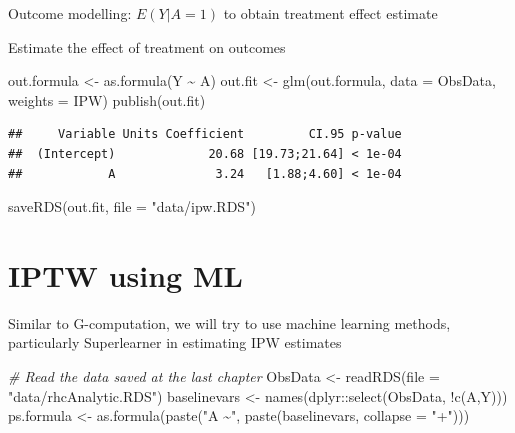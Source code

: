 \documentclass[
]{book}
\newenvironment{Shaded}{\begin{snugshade}}{\end{snugshade}}
\newcommand{\AttributeTok}[1]{\textcolor[rgb]{0.77,0.63,0.00}{#1}}
\newcommand{\CommentTok}[1]{\textcolor[rgb]{0.56,0.35,0.01}{\textit{#1}}}
\newcommand{\FunctionTok}[1]{\textcolor[rgb]{0.00,0.00,0.00}{#1}}
\newcommand{\NormalTok}[1]{#1}
\newcommand{\OtherTok}[1]{\textcolor[rgb]{0.56,0.35,0.01}{#1}}
\newcommand{\SpecialCharTok}[1]{\textcolor[rgb]{0.00,0.00,0.00}{#1}}
\newcommand{\StringTok}[1]{\textcolor[rgb]{0.31,0.60,0.02}{#1}}
\begin{document}
\begin{rmdcomment}
Outcome modelling: \(E(Y|A=1)\) to obtain treatment effect estimate
\end{rmdcomment}

Estimate the effect of treatment on outcomes

\begin{Shaded}
\begin{Highlighting}[]
\NormalTok{out.formula }\OtherTok{\textless{}{-}} \FunctionTok{as.formula}\NormalTok{(Y }\SpecialCharTok{\textasciitilde{}}\NormalTok{ A)}
\NormalTok{out.fit }\OtherTok{\textless{}{-}} \FunctionTok{glm}\NormalTok{(out.formula,}
               \AttributeTok{data =}\NormalTok{ ObsData,}
               \AttributeTok{weights =}\NormalTok{ IPW)}
\FunctionTok{publish}\NormalTok{(out.fit)}
\end{Highlighting}
\end{Shaded}

\begin{verbatim}
##     Variable Units Coefficient         CI.95 p-value 
##  (Intercept)             20.68 [19.73;21.64] < 1e-04 
##            A              3.24   [1.88;4.60] < 1e-04
\end{verbatim}

\begin{Shaded}
\begin{Highlighting}[]
\FunctionTok{saveRDS}\NormalTok{(out.fit, }\AttributeTok{file =} \StringTok{"data/ipw.RDS"}\NormalTok{)}
\end{Highlighting}
\end{Shaded}

\hypertarget{iptw-using-ml}{%
\chapter{IPTW using ML}\label{iptw-using-ml}}

Similar to G-computation, we will try to use machine learning methods, particularly Superlearner in estimating IPW estimates

\begin{Shaded}
\begin{Highlighting}[]
\CommentTok{\# Read the data saved at the last chapter}
\NormalTok{ObsData }\OtherTok{\textless{}{-}} \FunctionTok{readRDS}\NormalTok{(}\AttributeTok{file =} \StringTok{"data/rhcAnalytic.RDS"}\NormalTok{)}
\NormalTok{baselinevars }\OtherTok{\textless{}{-}} \FunctionTok{names}\NormalTok{(dplyr}\SpecialCharTok{::}\FunctionTok{select}\NormalTok{(ObsData, }\SpecialCharTok{!}\FunctionTok{c}\NormalTok{(A,Y)))}
\NormalTok{ps.formula }\OtherTok{\textless{}{-}} \FunctionTok{as.formula}\NormalTok{(}\FunctionTok{paste}\NormalTok{(}\StringTok{"A \textasciitilde{}"}\NormalTok{,}
                               \FunctionTok{paste}\NormalTok{(baselinevars,}
                                     \AttributeTok{collapse =} \StringTok{"+"}\NormalTok{)))}
\end{Highlighting}
\end{Shaded}
\end{document}
